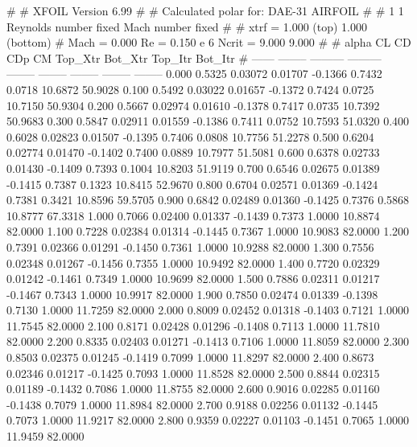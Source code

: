 #  
#       XFOIL         Version 6.99
#  
# Calculated polar for: DAE-31 AIRFOIL                                  
#  
# 1 1 Reynolds number fixed          Mach number fixed         
#  
# xtrf =   1.000 (top)        1.000 (bottom)  
# Mach =   0.000     Re =     0.150 e 6     Ncrit =   9.000  9.000
#  
#   alpha    CL        CD       CDp       CM     Top_Xtr  Bot_Xtr  Top_Itr  Bot_Itr
#  ------ -------- --------- --------- -------- -------- -------- -------- --------
   0.000   0.5325   0.03072   0.01707  -0.1366   0.7432   0.0718  10.6872  50.9028
   0.100   0.5492   0.03022   0.01657  -0.1372   0.7424   0.0725  10.7150  50.9304
   0.200   0.5667   0.02974   0.01610  -0.1378   0.7417   0.0735  10.7392  50.9683
   0.300   0.5847   0.02911   0.01559  -0.1386   0.7411   0.0752  10.7593  51.0320
   0.400   0.6028   0.02823   0.01507  -0.1395   0.7406   0.0808  10.7756  51.2278
   0.500   0.6204   0.02774   0.01470  -0.1402   0.7400   0.0889  10.7977  51.5081
   0.600   0.6378   0.02733   0.01430  -0.1409   0.7393   0.1004  10.8203  51.9119
   0.700   0.6546   0.02675   0.01389  -0.1415   0.7387   0.1323  10.8415  52.9670
   0.800   0.6704   0.02571   0.01369  -0.1424   0.7381   0.3421  10.8596  59.5705
   0.900   0.6842   0.02489   0.01360  -0.1425   0.7376   0.5868  10.8777  67.3318
   1.000   0.7066   0.02400   0.01337  -0.1439   0.7373   1.0000  10.8874  82.0000
   1.100   0.7228   0.02384   0.01314  -0.1445   0.7367   1.0000  10.9083  82.0000
   1.200   0.7391   0.02366   0.01291  -0.1450   0.7361   1.0000  10.9288  82.0000
   1.300   0.7556   0.02348   0.01267  -0.1456   0.7355   1.0000  10.9492  82.0000
   1.400   0.7720   0.02329   0.01242  -0.1461   0.7349   1.0000  10.9699  82.0000
   1.500   0.7886   0.02311   0.01217  -0.1467   0.7343   1.0000  10.9917  82.0000
   1.900   0.7850   0.02474   0.01339  -0.1398   0.7130   1.0000  11.7259  82.0000
   2.000   0.8009   0.02452   0.01318  -0.1403   0.7121   1.0000  11.7545  82.0000
   2.100   0.8171   0.02428   0.01296  -0.1408   0.7113   1.0000  11.7810  82.0000
   2.200   0.8335   0.02403   0.01271  -0.1413   0.7106   1.0000  11.8059  82.0000
   2.300   0.8503   0.02375   0.01245  -0.1419   0.7099   1.0000  11.8297  82.0000
   2.400   0.8673   0.02346   0.01217  -0.1425   0.7093   1.0000  11.8528  82.0000
   2.500   0.8844   0.02315   0.01189  -0.1432   0.7086   1.0000  11.8755  82.0000
   2.600   0.9016   0.02285   0.01160  -0.1438   0.7079   1.0000  11.8984  82.0000
   2.700   0.9188   0.02256   0.01132  -0.1445   0.7073   1.0000  11.9217  82.0000
   2.800   0.9359   0.02227   0.01103  -0.1451   0.7065   1.0000  11.9459  82.0000
